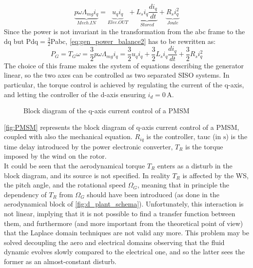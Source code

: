 \begin{equation}
  \underbrace{p\omega\Lambda_{mg}i_q}_{Mech. IN} = \underbrace{u_qi_q}_{Elec. OUT}+ \underbrace{L_{s} i_q\frac{di_q}{dt}}_{Stored} + \underbrace{R_{s}i_q^2}_{Joule}
  \label{eq:gen_power_balance2}
\end{equation}
Since the power is not invariant in the transformation from the abc frame to the dq but \acrshort{Pdq}$= \frac{3}{2}$\acrshort{Pabc}, \autoref{eq:gen_power_balance2} has to be rewritten as:
\begin{equation}
  P_G = T_G\omega = \frac{3}{2}p\omega\Lambda_{mg}i_q = \frac{3}{2}u_qi_q + \frac{3}{2}L_{s} i_q\frac{di_q}{dt} + \frac{3}{2}R_{s} i_q^2
  \label{eq:gen_power_balance3}
\end{equation}
The choice of this frame makes the system of equations describing the generator linear, so the two axes can be controlled as two separated \acrfull{SISO} systems. In particular, the torque control is achieved by regulating the current of the q-axis, and letting the controller of the d-axis ensuring $i_d=0 \, \si{\ampere}$.
\begin{figure}[htb]

\caption{Block diagram of the q-axis current control of a PMSM}
\label{fig:PMSM}
\end{figure}

\autoref{fig:PMSM} represents the block diagram of q-axis current control of a \acrshort{PMSM}, coupled with also the mechanical equation. $R_{iq}$ is the controller, \acrshort{tauc} (in $\si{\second}$) is the time delay introduced by the power electronic converter, $T_R$ is the torque imposed by the wind on the rotor.\\
It could be seen that the aerodynamical torque $T_R$ enters as a disturb in the block diagram, and its source is not specified. In reality $T_R$ is affected by the \acrshort{WS}, the pitch angle, and the rotational speed $\Omega_G$, meaning that in principle the dependency of $T_R$ from $\Omega_G$ should have been introduced (as done in the aerodynamical block of \autoref{fig:d_plant_schema}). Unfortunately, this interaction is not linear, implying that it is not possible to find a transfer function between them, and furthermore (and more important from the theoretical point of view) that the Laplace domain techniques are not valid any more. This problem may be solved decoupling the aero and electrical domains observing that the fluid dynamic evolves slowly compared to the electrical one, and so the latter sees the former as an almost-constant disturb. 

